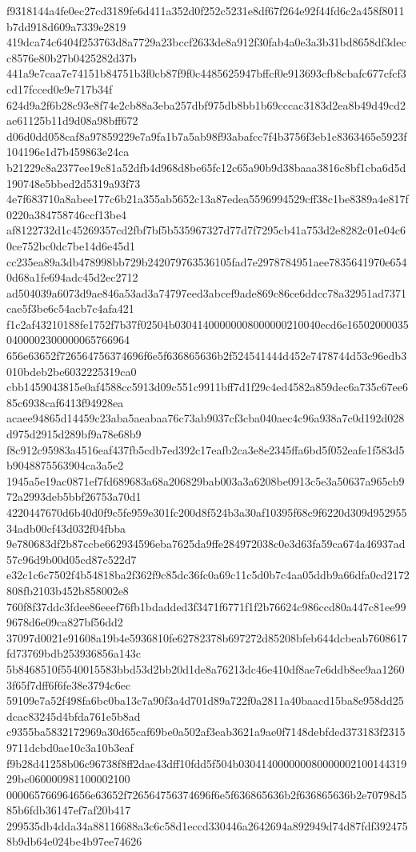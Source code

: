 {f9318144a4fe0ec27cd3189fe6d411a352d0f252c5231e8df67f264e92f44fd6c2a458f8011b7dd918d609a7339e2819
419dca74c6404f253763d8a7729a23bccf2633de8a912f30fab4a0e3a3b31bd8658df3decc8576e80b27b0425282d37b
441a9e7caa7e74151b84751b3f0cb87f9f0c4485625947bffcf0e913693cfb8cbafc677cfcf3cd17fcced0e9e717b34f
624d9a2f6b28c93e8f74e2cb88a3eba257dbf975db8bb1b69cccac3183d2ea8b49d49cd2ae61125b11d9d08a98bff672
d06d0dd058caf8a97859229e7a9fa1b7a5ab98f93abafcc7f4b3756f3eb1c8363465e5923f104196e1d7b459863e24ca
b21229c8a2377ee19c81a52dfb4d968d8be65fc12c65a90b9d38baaa3816c8bf1cba6d5d190748e5bbed2d5319a93f73
4e7f683710a8abee177c6b21a355ab5652c13a87edea5596994529cff38c1be8389a4e817f0220a384758746ccf13be4
af8122732d1c45269357cd2fbf7bf5b535967327d77d7f7295cb41a753d2e8282c01e04c60ce752bc0dc7be14d6e45d1
cc235ea89a3db478998bb729b242079763536105fad7e2978784951aee7835641970e6540d68a1fe694adc45d2ec2712
ad504039a6073d9ae846a53ad3a74797eed3abcef9ade869c86ce6ddcc78a32951ad7371cae5f3be6c54acb7c4afa421
f1c2af43210188fe1752f7b37f02504b03041400000008000000210040ecd6e165020000350400002300000065766964
656e63652f726564756374696f6e5f636865636b2f524541444d452e7478744d53c96edb3010bdeb2be6032225319ca0
cbb1459043815e0af4588cc5913d09c551c9911bff7d1f29c4ed4582a859dec6a735c67ee685c6938caf6413f94928ea
acaee94865d14459c23aba5aeabaa76c73ab9037cf3cba040aec4c96a938a7c0d192d028d975d2915d289bf9a78e68b9
f8c912c95983a4516eaf437fb5cdb7ed392c17eafb2ca3e8e2345ffa6bd5f052eafe1f583d5b9048875563904ca3a5e2
1945a5e19ac0871ef7fd689683a68a206829bab003a3a6208be0913c5e3a50637a965cb972a2993deb5bbf26753a70d1
4220447670d6b40d0f9c5fe959e301fc200d8f524b3a30af10395f68c9f6220d309d95295534adb00cf43d032f04fbba
9e780683df2b87ccbe662934596eba7625da9ffe284972038c0e3d63fa59ca674a46937ad57c96d9b00d05cd87c522d7
e32c1c6c7502f4b54818ba2f362f9c85dc36fc0a69c11c5d0b7c4aa05ddb9a66dfa0cd2172808fb2103b452b858002e8
760f8f37ddc3fdee86eeef76fb1bdadded3f3471f6771f1f2b76624c986ccd80a447c81ee999678d6e09ca827bf56dd2
37097d0021e91608a19b4e5936810fe62782378b697272d85208bfeb644dcbeab7608617fd73769bdb253936856a143c
5b8468510f5540015583bbd53d2bb20d1de8a76213dc46e410df8ae7e6ddb8ee9aa12603f65f7dff6f6fe38e3794c6ec
59109e7a52f498fa6bc0ba13c7a90f3a4d701d89a722f0a2811a40baacd15ba8e958dd25dcac83245d4bfda761e5b8ad
c9355ba5832172969a30d65caf69be0a502af3eab3621a9ae0f7148debfded373183f23159711dcbd0ae10c3a10b3eaf
f9b28d41258b06c96738f8ff2dae43dff10fdd5f504b03041400000008000000210014431929bc060000981100002100
000065766964656e63652f726564756374696f6e5f636865636b2f636865636b2e70798d585b6fdb36147ef7af20b417
299535db4dda34a88116688a3c6c58d1eccd330446a2642694a892949d74d87fdf3924758b9db64e024be4b97ee74626
}

